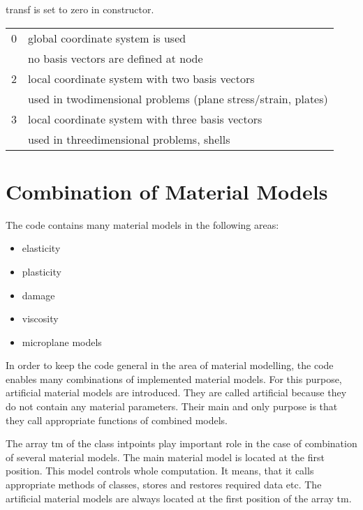 {\sf transf} is set to zero in constructor.

\begin{center}
\begin{tabular}{|c|l|}
\hline
0 & global coordinate system is used
\\
  & no basis vectors are defined at node
\\[2mm] \hline
2 & local coordinate system with two basis vectors
\\
  & used in twodimensional problems (plane stress/strain, plates)
\\[2mm] \hline
3 & local coordinate system with three basis vectors
\\
  & used in threedimensional problems, shells
\\ \hline
\end{tabular}
\end{center}



\section{Combination of Material Models}

The code contains many material models in the following areas:
\begin{itemize}
\item{elasticity}
\item{plasticity}
\item{damage}
\item{viscosity}
\item{microplane models}
\end{itemize}

In order to keep the code general in the area of material modelling, the code enables many combinations
of implemented material models. For this purpose, artificial material models are introduced. They are called
artificial because they do not contain any material parameters. Their main and only purpose is that they
call appropriate functions of combined models.

The array {\sf tm} of the class {\sf intpoints} play important role in the case of combination of several
material models. The main material model is located at the first position. This model controls whole
computation. It means, that it calls appropriate methods of classes, stores and restores required data etc.
The artificial material models are always located at the first position of the array {\sf tm}.

